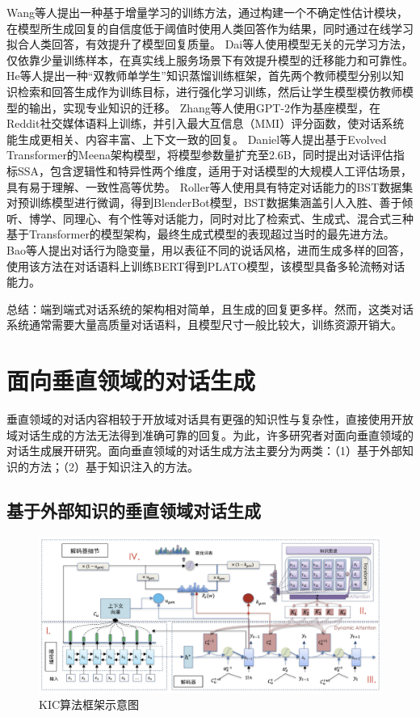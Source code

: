 Wang等人\cite{DBLP:conf/acl/WangZLHZL19}提出一种基于增量学习的训练方法，通过构建一个不确定性估计模块，在模型所生成回复的自信度低于阈值时使用人类回答作为结果，同时通过在线学习拟合人类回答，有效提升了模型回复质量。
Dai等人\cite{DBLP:conf/acl/DaiLTLSZ20}使用模型无关的元学习方法，仅依靠少量训练样本，在真实线上服务场景下有效提升模型的迁移能力和可靠性。
He等人\cite{DBLP:conf/emnlp/HeYYLSX20}提出一种“双教师单学生”知识蒸馏训练框架，首先两个教师模型分别以知识检索和回答生成作为训练目标，进行强化学习训练，然后让学生模型模仿教师模型的输出，实现专业知识的迁移。
Zhang等人\cite{DBLP:conf/acl/ZhangSGCBGGLD20}使用GPT-2\cite{radford2019language}作为基座模型，在Reddit社交媒体语料上训练，并引入最大互信息（MMI）评分函数，使对话系统能生成更相关、内容丰富、上下文一致的回复。
Daniel等人\cite{DBLP:journals/corr/abs-2001-09977}提出基于Evolved Transformer的Meena架构模型，将模型参数量扩充至2.6B，同时提出对话评估指标SSA，包含逻辑性和特异性两个维度，适用于对话模型的大规模人工评估场景，具有易于理解、一致性高等优势。
Roller等人\cite{DBLP:conf/eacl/RollerDGJWLXOSB21}使用具有特定对话能力的BST数据集对预训练模型进行微调，得到BlenderBot模型，BST数据集涵盖引人入胜、善于倾听、博学、同理心、有个性等对话能力，同时对比了检索式、生成式、混合式三种基于Transformer的模型架构，最终生成式模型的表现超过当时的最先进方法。
Bao等人\cite{DBLP:conf/acl/BaoHWWW20}提出对话行为隐变量，用以表征不同的说话风格，进而生成多样的回答，使用该方法在对话语料上训练BERT得到PLATO模型，该模型具备多轮流畅对话能力。

总结：端到端式对话系统的架构相对简单，且生成的回复更多样。然而，这类对话系统通常需要大量高质量对话语料，且模型尺寸一般比较大，训练资源开销大。

\section{面向垂直领域的对话生成}

垂直领域的对话内容相较于开放域对话具有更强的知识性与复杂性，直接使用开放域对话生成的方法无法得到准确可靠的回复。为此，许多研究者对面向垂直领域的对话生成展开研究。面向垂直领域的对话生成方法主要分为两类：（1）基于外部知识的方法；（2）基于知识注入的方法。

\subsection{基于外部知识的垂直领域对话生成}

\begin{figure}[htbp]
	\centering
	\includegraphics[scale=0.48]{Fig/KIC.png}
	\caption{\label{kic_architecture}KIC算法框架示意图\cite{DBLP:conf/acl/LinJHWC20}}
\end{figure}

